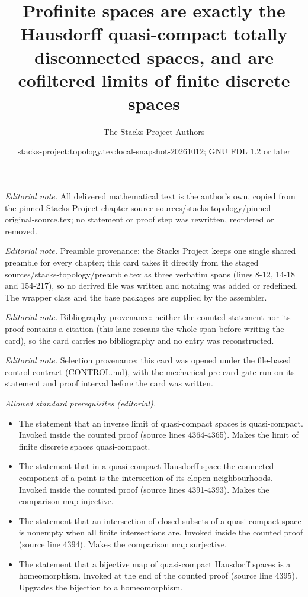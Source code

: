 \documentclass[10pt,a4paper]{amsart}
\title{Profinite spaces are exactly the Hausdorff quasi-compact totally disconnected spaces, and are cofiltered limits of finite discrete spaces}
\author{The Stacks Project Authors}
\date{stacks-project:topology.tex:local-snapshot-20261012; GNU FDL 1.2 or later}
\theoremstyle{plain}
\theoremstyle{definition}
\theoremstyle{remark}
\numberwithin{equation}{subsection}
\begin{document}
\maketitle
\noindent\textit{Editorial note.} All delivered mathematical text is the author's own, copied from the pinned Stacks Project chapter source sources/stacks-topology/pinned-original-source.tex; no statement or proof step was rewritten, reordered or removed.\par\medskip
\noindent\textit{Editorial note.} Preamble provenance: the Stacks Project keeps one single shared preamble for every chapter; this card takes it directly from the staged sources/stacks-topology/preamble.tex as three verbatim spans (lines 8-12, 14-18 and 154-217), so no derived file was written and nothing was added or redefined. The wrapper class and the base packages are supplied by the assembler.\par\medskip
\noindent\textit{Editorial note.} Bibliography provenance: neither the counted statement nor its proof contains a citation (this lane rescans the whole span before writing the card), so the card carries no bibliography and no entry was reconstructed.\par\medskip
\noindent\textit{Editorial note.} Selection provenance: this card was opened under the file-based control contract (CONTROL.md), with the mechanical pre-card gate run on its statement and proof interval before the card was written.\par\medskip
\noindent\textit{Allowed standard prerequisites (editorial).}\begin{itemize}
\item The statement that an inverse limit of quasi-compact spaces is quasi-compact. Invoked inside the counted proof (source lines 4364-4365). Makes the limit of finite discrete spaces quasi-compact.
\item The statement that in a quasi-compact Hausdorff space the connected component of a point is the intersection of its clopen neighbourhoods. Invoked inside the counted proof (source lines 4391-4393). Makes the comparison map injective.
\item The statement that an intersection of closed subsets of a quasi-compact space is nonempty when all finite intersections are. Invoked inside the counted proof (source line 4394). Makes the comparison map surjective.
\item The statement that a bijective map of quasi-compact Hausdorff spaces is a homeomorphism. Invoked at the end of the counted proof (source line 4395). Upgrades the bijection to a homeomorphism.
\end{itemize}\medskip
\end{document}

